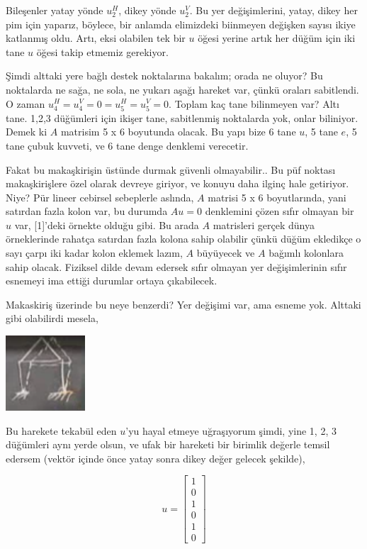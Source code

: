 \documentclass[12pt,fleqn]{article}\usepackage{../../common}
\begin{document}
Bileşenler yatay yönde $u_2^H$, dikey yönde $u_2^V$. Bu yer değişimlerini,
yatay, dikey her pim için yaparız, böylece, bir anlamda elimizdeki biinmeyen
değişken sayısı ikiye katlanmış oldu. Artı, eksi olabilen tek bir $u$ öğesi
yerine artık her düğüm için iki tane $u$ öğesi takip etmemiz gerekiyor.

Şimdi alttaki yere bağlı destek noktalarına bakalım; orada ne oluyor?  Bu
noktalarda ne sağa, ne sola, ne yukarı aşağı hareket var, çünkü oraları
sabitlendi. O zaman $u_4^H = u_4^V = 0 = u_5^H = u_5^V = 0$.  Toplam kaç tane
bilinmeyen var? Altı tane. 1,2,3 düğümleri için ikişer tane, sabitlenmiş
noktalarda yok, onlar biliniyor. Demek ki $A$ matrisim 5 x 6 boyutunda olacak.
Bu yapı bize 6 tane $u$, 5 tane $e$, 5 tane çubuk kuvveti, ve 6 tane denge
denklemi verecetir.

Fakat bu makaşkirişin üstünde durmak güvenli olmayabilir.. Bu püf noktası
makaşkirişlere özel olarak devreye giriyor, ve konuyu daha ilginç hale
getiriyor. Niye? Pür lineer cebirsel sebeplerle aslında, $A$ matrisi 5 x 6
boyutlarında, yani satırdan fazla kolon var, bu durumda $A u = 0$ denklemini
çözen sıfır olmayan bir $u$ var, [1]'deki örnekte olduğu gibi. Bu arada $A$
matrisleri gerçek dünya örneklerinde rahatça satırdan fazla kolona sahip
olabilir çünkü düğüm ekledikçe o sayı çarpı iki kadar kolon eklemek lazım, $A$
büyüyecek ve $A$ bağımlı kolonlara sahip olacak. Fiziksel dilde devam edersek
sıfır olmayan yer değişimlerinin sıfır esnemeyi ima ettiği durumlar ortaya
çıkabilecek.

Makaskiriş üzerinde bu neye benzerdi? Yer değişimi var, ama esneme yok.  Alttaki
gibi olabilirdi mesela,

\includegraphics[width=8em]{compscieng_1_15_03.png}

Bu harekete tekabül eden $u$'yu hayal etmeye uğraşıyorum şimdi, yine 1, 2, 3
düğümleri aynı yerde olsun, ve ufak bir hareketi bir birimlik değerle temsil
edersem (vektör içinde önce yatay sonra dikey değer gelecek şekilde),

$$
u = \left[\begin{array}{r}
1 \\ 0 \\ 1 \\ 0 \\ 1 \\ 0
\end{array}\right]
$$
\end{document}
